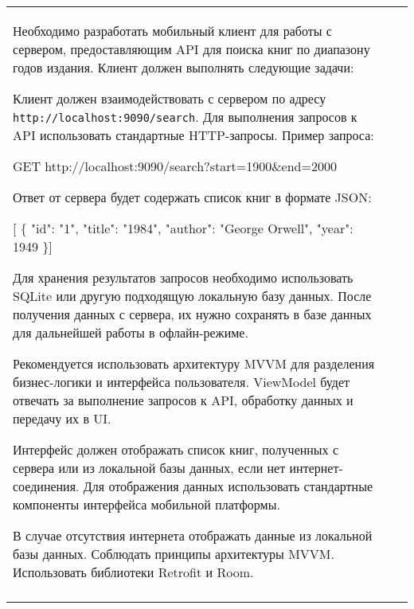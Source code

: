 \documentclass[a4paper]{article}
\begin{document}
\begin{tabular}{!{\vrule width 2pt}p{5cm}|p{6cm}|p{4cm}!{\vrule width 2pt}}
{\begin{minipage}{16cm}
\begin{enumerate}
Необходимо разработать мобильный клиент для работы с сервером, предоставляющим API для поиска книг по диапазону годов издания. Клиент должен выполнять следующие задачи:


Клиент должен взаимодействовать с сервером по адресу \texttt{http://localhost:9090/search}. Для выполнения запросов к API использовать стандартные HTTP-запросы. Пример запроса:

 GET http://localhost:9090/search?start=1900\&end=2000 

Ответ от сервера будет содержать список книг в формате JSON:

 [ \{ "id": "1", "title": "1984", "author": "George Orwell", "year": 1949 \}] 


Для хранения результатов запросов необходимо использовать SQLite или другую подходящую локальную базу данных. После получения данных с сервера, их нужно сохранять в базе данных для дальнейшей работы в офлайн-режиме.


Рекомендуется использовать архитектуру MVVM для разделения бизнес-логики и интерфейса пользователя. ViewModel будет отвечать за выполнение запросов к API, обработку данных и передачу их в UI.


Интерфейс должен отображать список книг, полученных с сервера или из локальной базы данных, если нет интернет-соединения. Для отображения данных использовать стандартные компоненты интерфейса мобильной платформы.


В случае отсутствия интернета отображать данные из локальной базы данных.
Соблюдать принципы архитектуры MVVM.
Использовать библиотеки Retrofit и Room. 
\end{enumerate}

\vspace{0.2cm}
    
\end{minipage}
}
\\
\end{tabular}
\end{document}
